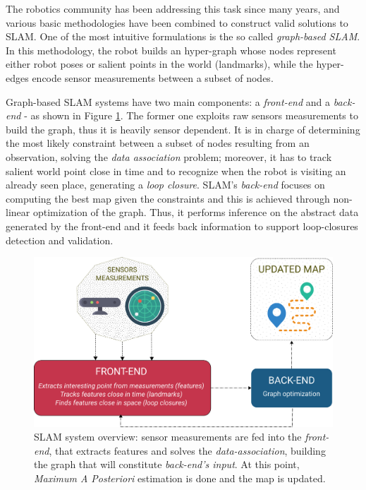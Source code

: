 \documentclass[10pt,a4paper, notitlepage]{report}
\begin{document}
The robotics community has been addressing this task since many years, and various basic methodologies have been combined to construct valid solutions to SLAM. One of the most intuitive formulations is the so called \textit{graph-based SLAM}\cite{lu1997globally}. In this methodology, the robot builds an hyper-graph whose nodes represent either robot poses or salient points in the world (landmarks), while the hyper-edges encode sensor measurements between a subset of nodes. 

Graph-based SLAM systems have two main components: a \textit{front-end} and a \textit{back-end} - as shown in Figure \ref{fig:slam-overview}. The former one exploits raw sensors measurements to build the graph, thus it is heavily sensor dependent. It is in charge of determining the most likely constraint between a subset of nodes resulting from an observation, solving the \textit{data association} problem; moreover, it has to track salient world point close in time and to recognize when the robot is visiting an already seen place, generating a \textit{loop closure}. SLAM's \textit{back-end} focuses on computing the best map given the constraints and this is achieved through non-linear optimization of the graph. Thus, it performs inference on the abstract data generated by the front-end and it feeds back information to support loop-closures detection and validation.

\begin{figure}[h]
    \centering
    \includegraphics[width=0.9\linewidth]{media/slam_system_mod.png}
    \caption{SLAM system overview: sensor measurements are fed into the \textit{front-end}, that extracts features and solves the \textit{data-association}, building the graph that will constitute \textit{back-end's input}. At this point, \textit{Maximum A Posteriori} estimation is done and the map is updated.}
    \label{fig:slam-overview}
\end{figure}
\end{document}
